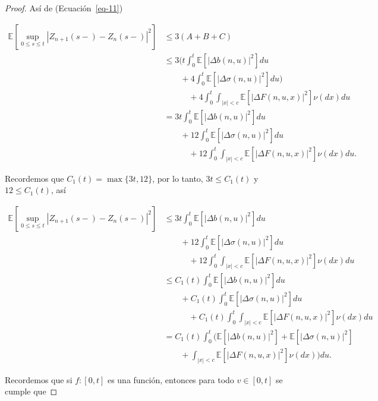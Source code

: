 \documentclass[
  spanish,
  us-letterpaper,
]{scrreprt}
\theoremstyle{plain}
\theoremstyle{plain}
\theoremstyle{definition}
\theoremstyle{plain}
\theoremstyle{remark}
\begin{document}
\begin{proof}
Así de (Ecuación~\ref{eq-11})

\[
    \begin{aligned}
        \mathbb{E}\left[\sup\limits_{0\leq s\leq t} \left|Z_{n+1}(s-)-Z_n(s-)\right|^2\right] & \leq 3(A+B+C)\\ 
        & \leq 3\Bigg(t\int_0^t \mathbb{E}\left[|\Delta b(n,u)|^2\right]du\\ 
        & \qquad + 4\int_0^t \mathbb{E}\left[|\Delta \sigma(n,u)|^2\right]du\Bigg)\\ 
        &  \qquad\quad + 4\int_0^t\int_{|x|<c}\mathbb{E}\left[|\Delta F(n,u,x)|^2\right]\nu(dx)du\\ 
        & = 3t\int_0^t \mathbb{E}\left[|\Delta b(n,u)|^2\right]du\\ 
        & \qquad + 12\int_0^t \mathbb{E}\left[|\Delta \sigma(n,u)|^2\right]du\\ 
        &  \qquad\quad + 12\int_0^t\int_{|x|<c}\mathbb{E}\left[|\Delta F(n,u,x)|^2\right]\nu(dx)du.
    \end{aligned}
\]

Recordemos que \(C_1(t)=\max\{3t,12\}\), por lo tanto, \(3t\leq C_1(t)\)
y \(12\leq C_1(t)\), así

\[
    \begin{aligned}
        \mathbb{E}\left[\sup\limits_{0\leq s\leq t} \left|Z_{n+1}(s-)-Z_n(s-)\right|^2\right] & \leq 3t\int_0^t \mathbb{E}\left[|\Delta b(n,u)|^2\right]du\\ 
        & \qquad + 12\int_0^t \mathbb{E}\left[|\Delta \sigma(n,u)|^2\right]du\\ 
        &  \qquad\quad + 12\int_0^t\int_{|x|<c}\mathbb{E}\left[|\Delta F(n,u,x)|^2\right]\nu(dx)du\\
        & \leq C_1(t)\int_0^t \mathbb{E}\left[|\Delta b(n,u)|^2\right]du\\ 
        & \qquad + C_1(t)\int_0^t \mathbb{E}\left[|\Delta \sigma(n,u)|^2\right]du\\ 
        &  \qquad\quad + C_1(t)\int_0^t\int_{|x|<c}\mathbb{E}\left[|\Delta F(n,u,x)|^2\right]\nu(dx)du\\
        & = C_1(t)\int_0^t\Bigg(\mathbb{E}\left[|\Delta b(n,u)|^2\right]+\mathbb{E}\left[|\Delta \sigma(n,u)|^2\right]\\ 
        & \qquad + \int_{|x|<c}\mathbb{E}\left[|\Delta F(n,u,x)|^2\right]\nu(dx)\Bigg)du.
    \end{aligned}
\]

Recordemos que si \(f:[0,t]\) es una función, entonces para todo
\(v\in [0,t]\) se cumple que


\end{proof}
\end{document}
